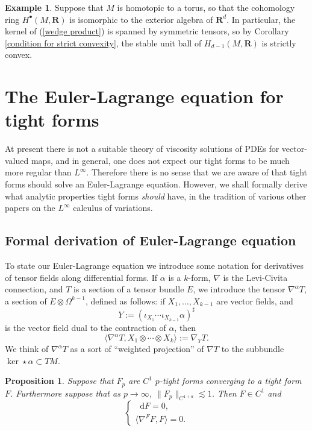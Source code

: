 \documentclass[reqno,11pt]{amsart}
\newcommand{\RR}{\mathbf{R}}
\newcommand*\dif{\mathop{}\!\mathrm{d}}
\newtheorem{proposition}[theorem]{Proposition}
\theoremstyle{definition}
\newtheorem{example}[theorem]{Example}
\numberwithin{equation}{section}
\begin{document}
\begin{example}\label{torus convex}
Suppose that $M$ is homotopic to a torus, so that the cohomology ring $H^\bullet(M, \RR)$ is isomorphic to the exterior algebra of $\RR^d$.
In particular, the kernel of (\ref{wedge product}) is spanned by symmetric tensors, so by Corollary \ref{condition for strict convexity}, the stable unit ball of $H_{d - 1}(M, \RR)$ is strictly convex.
\end{example}






\section{The Euler-Lagrange equation for tight forms}\label{infinityMax}
At present there is not a suitable theory of viscosity solutions of PDEs for vector-valued maps, and in general, one does not expect our tight forms to be much more regular than $L^\infty$.
Therefore there is no sense that we are aware of that tight forms should solve an Euler-Lagrange equation.
However, we shall formally derive what analytic properties tight forms \emph{should} have, in the tradition of various other papers \cite{Barron2001,Aronsson67,Sheffield12} on the $L^\infty$ calculus of variations.

\subsection{Formal derivation of Euler-Lagrange equation}
To state our Euler-Lagrange equation we introduce some notation for derivatives of tensor fields along differential forms.
If $\alpha$ is a $k$-form, $\nabla$ is the Levi-Civita connection, and $T$ is a section of a tensor bundle $E$, we introduce the tensor $\nabla^\alpha T$, a section of $E \otimes \Omega^{k - 1}$, defined as follows: if $X_1, \dots, X_{k - 1}$ are vector fields, and
$$Y := (\iota_{X_1} \cdots \iota_{X_{k - 1}} \alpha)^\sharp$$
is the vector field dual to the contraction of $\alpha$, then
$$\langle \nabla^\alpha T, X_1 \otimes \cdots \otimes X_k\rangle := \nabla_Y T.$$
We think of $\nabla^\alpha T$ as a sort of ``weighted projection'' of $\nabla T$ to the subbundle $\ker \star \alpha \subset TM$.

\begin{proposition}
Suppose that $F_p$ are $C^1$ $p$-tight forms converging to a tight form $F$.
Furthermore suppose that as $p \to \infty$, $\|F_p\|_{C^{1 + \alpha}} \lesssim 1$.
Then $F \in C^1$ and 
\begin{equation}\label{infty Max}
\begin{cases}
\dif F = 0, \\
\langle \nabla^F F, F\rangle = 0.
\end{cases}
\end{equation}
\end{proposition}
\end{document}
